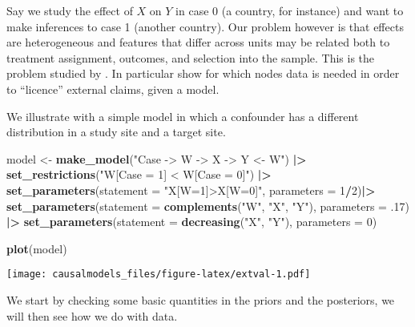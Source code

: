\documentclass[
  12pt,
]{book}
\newenvironment{Shaded}{\begin{snugshade}}{\end{snugshade}}
\newcommand{\AttributeTok}[1]{\textcolor[rgb]{0.13,0.29,0.53}{#1}}
\newcommand{\DecValTok}[1]{\textcolor[rgb]{0.00,0.00,0.81}{#1}}
\newcommand{\FunctionTok}[1]{\textcolor[rgb]{0.13,0.29,0.53}{\textbf{#1}}}
\newcommand{\NormalTok}[1]{#1}
\newcommand{\OtherTok}[1]{\textcolor[rgb]{0.56,0.35,0.01}{#1}}
\newcommand{\SpecialCharTok}[1]{\textcolor[rgb]{0.81,0.36,0.00}{\textbf{#1}}}
\newcommand{\StringTok}[1]{\textcolor[rgb]{0.31,0.60,0.02}{#1}}
\begin{document}
Say we study the effect of \(X\) on \(Y\) in case 0 (a country, for instance) and want to make inferences to case 1 (another country). Our problem however is that effects are heterogeneous and features that differ across units may be related both to treatment assignment, outcomes, and selection into the sample. This is the problem studied by \citet{pearl2014external}. In particular \citet{pearl2014external} show for which nodes data is needed in order to ``licence'' external claims, given a model.

We illustrate with a simple model in which a confounder has a different distribution in a study site and a target site.

\begin{Shaded}
\begin{Highlighting}[]
\NormalTok{model }\OtherTok{\textless{}{-}} \FunctionTok{make\_model}\NormalTok{(}\StringTok{"Case {-}\textgreater{} W  {-}\textgreater{} X {-}\textgreater{} Y \textless{}{-} W"}\NormalTok{) }\SpecialCharTok{|\textgreater{}}
  \FunctionTok{set\_restrictions}\NormalTok{(}\StringTok{"W[Case = 1] \textless{} W[Case = 0]"}\NormalTok{) }\SpecialCharTok{|\textgreater{}}
  \FunctionTok{set\_parameters}\NormalTok{(}\AttributeTok{statement =} \StringTok{"X[W=1]\textgreater{}X[W=0]"}\NormalTok{, }\AttributeTok{parameters =} \DecValTok{1}\SpecialCharTok{/}\DecValTok{2}\NormalTok{)}\SpecialCharTok{|\textgreater{}}
  \FunctionTok{set\_parameters}\NormalTok{(}\AttributeTok{statement =} \FunctionTok{complements}\NormalTok{(}\StringTok{"W"}\NormalTok{, }\StringTok{"X"}\NormalTok{, }\StringTok{"Y"}\NormalTok{), }\AttributeTok{parameters =}\NormalTok{ .}\DecValTok{17}\NormalTok{) }\SpecialCharTok{|\textgreater{}}
  \FunctionTok{set\_parameters}\NormalTok{(}\AttributeTok{statement =} \FunctionTok{decreasing}\NormalTok{(}\StringTok{"X"}\NormalTok{, }\StringTok{"Y"}\NormalTok{), }\AttributeTok{parameters =} \DecValTok{0}\NormalTok{) }

\FunctionTok{plot}\NormalTok{(model)}
\end{Highlighting}
\end{Shaded}

\texttt{[image: causalmodels\_files/figure-latex/extval-1.pdf]}

We start by checking some basic quantities in the priors and the posteriors, we will then see how we do with data.
\end{document}
